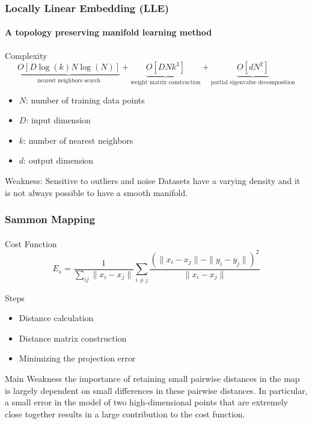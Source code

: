 \documentclass{beamer}
\begin{document}
\begin{frame}
  \frametitle{Locally Linear Embedding (LLE)}
  \framesubtitle{A topology preserving manifold learning method}
  
  \begin{block}{Complexity}
    \[
      \underbrace{O[D \log(k) N \log(N)]}_{\text{nearest neighbors search}}  + 
      \underbrace{O[D N k^3]}_{\text{weight matrix construction}} + 
      \underbrace{O[d N^2]}_{\text{partial eigenvalue decomposition}}
    \]
    \begin{itemize}
      \item $N$: number of training data points
      \item $D$: input dimension
      \item $k$: number of nearest neighbors
      \item $d$: output dimension
    \end{itemize}
  \end{block}

  
  \begin{block}{Weakness: Sensitive to outliers and noise}
    Datasets have a varying density and it is not always possible to have a smooth manifold.
  \end{block}
  
\end{frame}

% 
% 
% 
% 
% 
% 
\begin{frame}
  \frametitle{Sammon Mapping }
  \framesubtitle{}

  Cost Function
  \[
    E_s = \frac{1}{\sum_{ij}   \| x_i - x_j \|}
    \sum_{i \neq j} 
    \frac{(\| x_i - x_j \| - \|y_i - y_j\|)^2}{\| x_i - x_j \|}
  \]

  Steps
  \begin{itemize}
    \item Distance calculation
    \item Distance matrix construction
    \item Minimizing the projection error
  \end{itemize}

  \begin{block}{Main Weakness}
    the importance of retaining small pairwise
  distances in the map is largely dependent on small differences in these pairwise distances. 
  In particular, a small error in the model of two high-dimensional points that are extremely close together
  results in a large contribution to the cost function.
  \end{block}

\end{frame}
\end{document}
